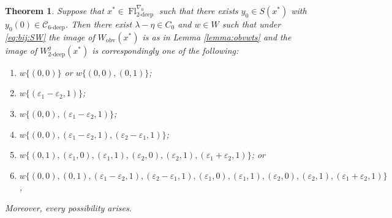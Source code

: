 \documentclass[oneside,a4paper,english, 11pt]{amsart}
\theoremstyle{plain}
\newtheorem{thm}{Theorem}[subsection]
\theoremstyle{plain}
\theoremstyle{plain}
\theoremstyle{plain}
\theoremstyle{plain}
\theoremstyle{plain}
\theoremstyle{definition}
\theoremstyle{definition}
\theoremstyle{definition}
\theoremstyle{remark}
\numberwithin{equation}{section}
\newcommand{\cC}{\mathcal{C}}
\newcommand{\eps}{\varepsilon}
\DeclareMathOperator{\Fl}{Fl}
\begin{document}
\begin{thm}\label{thm:Wg'}
Suppose that $x^* \in \Fl_{2\textrm{-deep}}^{\nabla_0}$ such that there exists $y_0\in S(x^*)$ with $y_0(0) \in \cC_{6\textrm{-deep}}$.
Then there exist $\lambda-\eta \in C_0$ and $w\in W$ such that under \eqref{eq:bij:SW} the image of $W_{\mathrm{obv}}(x^*)$ is as in Lemma \ref{lemma:obvwts} and the image of $W^g_{2\textrm{-deep}}(x^*)$ is correspondingly one of the following: 
\begin{enumerate}
\item
\label{case1:thm:Wg}
$w\{(0,0)\}$ or $w\{(0,0),(0,1)\}$;
\item 
\label{case2:thm:Wg}
$w\{(\eps_1-\eps_2,1)\}$;
\item 
\label{case3:thm:Wg}
$w\{(0,0),(\eps_1-\eps_2,1)\}$;
\item 
\label{case4:thm:Wg}
$w\{(0,0),(\eps_1-\eps_2,1), (\eps_2-\eps_1,1)\}$;
\item 
\label{case5:thm:Wg}
$w\{(0,1),(\eps_1,0),(\eps_1,1), (\eps_2,0),(\eps_2,1), (\eps_1+\eps_2,1)\}$; or
\item 
\label{case6:thm:Wg}
$w\{(0,0),(0,1),(\eps_1-\eps_2,1), (\eps_2-\eps_1,1), (\eps_1,0),(\eps_1,1),(\eps_2,0),(\eps_2,1),(\eps_1+\eps_2,1)\}$,
\end{enumerate}
Moreover, every possibility arises.
\end{thm}
\end{document}
